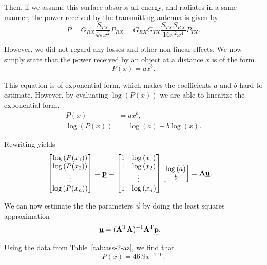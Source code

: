 \documentclass[11pt,titlepage]{report}
\begin{document}
Then, if we assume this surface absorbs all energy, and radiates in a same manner, the power received by the transmitting antenna is given by
\begin{equation}
	P = G_{RX} \frac{S_{TX}}{4 \pi x^2}P_{RX} = G_{RX} G_{TX} \frac{S_{TX} S_{RX}}{16 \pi^2 x^4} P_{TX}.
\end{equation}

However, we did not regard any losses and other non-linear effects. We now simply state that the power received by an object at a distance $x$ is of the form
\begin{equation}
	P(x) = a x^b.
\end{equation}

This equation is of exponential form, which makes the coefficients $a$ and $b$ hard to estimate. However, by evaluating $\log{(P(x))}$ we are able to linearize the exponential form.
\begin{align}
	P(x)&=a x^b, \\
	\log{(P(x))} &= \log{(a)} + b \log{(x)}.
\end{align}

Rewriting yields
\begin{align}
	\begin{bmatrix}
		\log{(P(x_1))} \\
		\log{(P(x_2))} \\
		\vdots \\
		\log{(P(x_n))}
	\end{bmatrix} &= \vec{p} = \begin{bmatrix}
		1 & \log{(x_1)} \\
		1 & \log{(x_2)} \\
		\multicolumn{2}{c}{\vdots} \\
		1 & \log{(x_n)}
	\end{bmatrix} \begin{bmatrix}
		\log{(a)} \\
		b
	\end{bmatrix} = \mat{A} \vec{u}.
\end{align}

We can now estimate the the parameters $\vec{u}$ by doing the least squares approximation
\begin{align}
	\mathbf{\underline{u}} &= (\mathbf{A}^{\text T} \mathbf{A})^{-1} \mathbf{A}^{\text T} \mathbf{\underline{p}}.
\end{align}

Using the data from Table~\ref{tab:ass-2-az}, we find that
\begin{equation} \label{eq:ass-2-exp}
	P(x) = 46.9 x^{-1.10}.
\end{equation}
\end{document}
